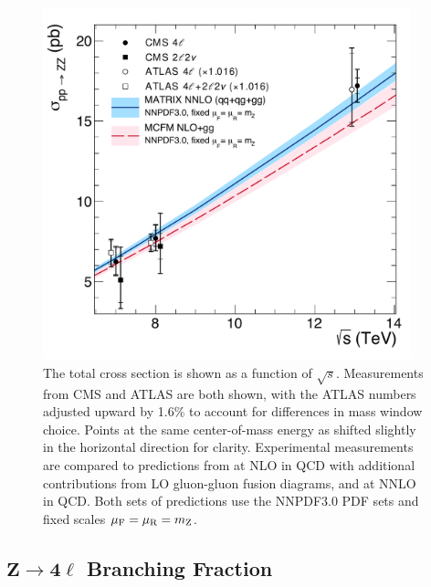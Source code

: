 \begin{figure}[htbp]
  \begin{center}
    \includegraphics[width=0.95\textwidth]{results/sqrts.pdf}
    \caption[Total {\ZZ} cross section as a function of center-of-mass energy]{
        The total {\ZZ} cross section is shown as a function of $\sqrt{s}$.
        Measurements from CMS and ATLAS are both shown, with the ATLAS numbers adjusted upward by 1.6\% to account for differences in {\PZ} mass window choice.
        Points at the same center-of-mass energy as shifted slightly in the horizontal direction for clarity.
        Experimental measurements are compared to predictions from {\MCFM} at NLO in QCD with additional contributions from LO gluon-gluon fusion diagrams, and {\MATRIX} at NNLO in QCD\@.
        Both sets of predictions use the NNPDF3.0 PDF sets and fixed scales $\mu_\text{F} = \mu_\text{R} = m_\mathrm{Z}$.
      }\label{fig:xsec_vs_sqrts}
  \end{center}
\end{figure}


\subsection[\texorpdfstring{$\mathrm{Z} \to 4\ell$}{Z to 4l} Branching  Fraction]{$\mathbf{Z} \to \mathbf{4\ell}$ Branching  Fraction}

